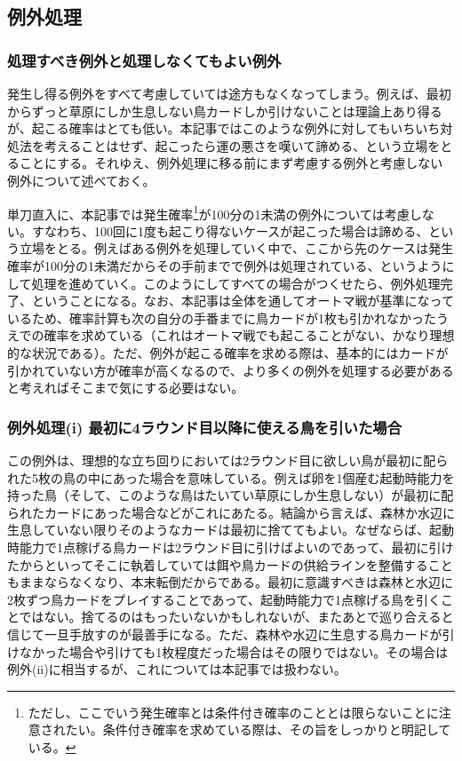 \subsection{例外処理}
\begin{multicols}{2}
\subsubsection{処理すべき例外と処理しなくてもよい例外}
発生し得る例外をすべて考慮していては途方もなくなってしまう。例えば、最初からずっと草原にしか生息しない鳥カードしか引けないことは理論上あり得るが、起こる確率はとても低い。本記事ではこのような例外に対してもいちいち対処法を考えることはせず、起こったら運の悪さを嘆いて諦める、という立場をとることにする。それゆえ、例外処理に移る前にまず考慮する例外と考慮しない例外について述べておく。
\par
単刀直入に、本記事では発生確率\footnote{ただし、ここでいう発生確率とは条件付き確率のこととは限らないことに注意されたい。条件付き確率を求めている際は、その旨をしっかりと明記している。}が100分の1未満の例外については考慮しない。すなわち、100回に1度も起こり得ないケースが起こった場合は諦める、という立場をとる。例えばある例外を処理していく中で、ここから先のケースは発生確率が100分の1未満だからその手前までで例外は処理されている、というようにして処理を進めていく。このようにしてすべての場合がつくせたら、例外処理完了、ということになる。なお、本記事は全体を通してオートマ戦が基準になっているため、確率計算も次の自分の手番までに鳥カードが1枚も引かれなかったうえでの確率を求めている（これはオートマ戦でも起こることがない、かなり理想的な状況である）。ただ、例外が起こる確率を求める際は、基本的にはカードが引かれていない方が確率が高くなるので、より多くの例外を処理する必要があると考えればそこまで気にする必要はない。

\subsubsection{例外処理(i) 最初に4ラウンド目以降に使える鳥を引いた場合}
この例外は、理想的な立ち回りにおいては2ラウンド目に欲しい鳥が最初に配られた5枚の鳥の中にあった場合を意味している。例えば卵を1個産む起動時能力を持った鳥（そして、このような鳥はたいてい草原にしか生息しない）が最初に配られたカードにあった場合などがこれにあたる。結論から言えば、森林か水辺に生息していない限りそのようなカードは最初に捨ててもよい。なぜならば、起動時能力で1点稼げる鳥カードは2ラウンド目に引けばよいのであって、最初に引けたからといってそこに執着していては餌や鳥カードの供給ラインを整備することもままならなくなり、本末転倒だからである。最初に意識すべきは森林と水辺に2枚ずつ鳥カードをプレイすることであって、起動時能力で1点稼げる鳥を引くことではない。捨てるのはもったいないかもしれないが、またあとで巡り合えると信じて一旦手放すのが最善手になる。ただ、森林や水辺に生息する鳥カードが引けなかった場合や引けても1枚程度だった場合はその限りではない。その場合は例外(i\hspace{-1.2pt}i)に相当するが、これについては本記事では扱わない。

\end{multicols}
